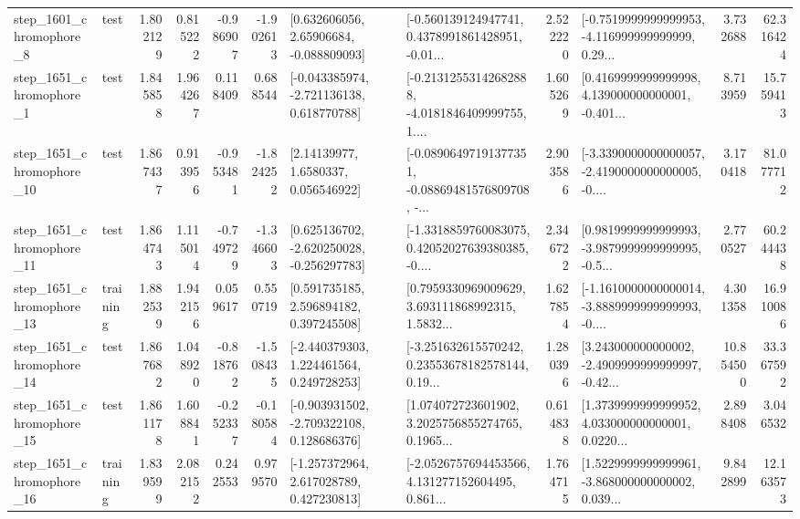 \begin{tabular}{llrrrrllrlrr}
  step\_1601\_chromophore\_8 &      test &      1.802129 &    0.815222 &     -0.986907 & -1.902613 &     [0.632606056, 2.65906684, -0.088809093] &  [-0.560139124947741, 0.4378991861428951, -0.01... &       2.522220 &  [-0.7519999999999953, -4.116999999999999, 0.29... &            3.732688 &         62.316424 \\
  step\_1651\_chromophore\_1 &      test &      1.845858 &    1.964267 &      0.118409 &  0.688544 &   [-0.043385974, -2.721136138, 0.618770788] &  [-0.21312553142682888, -4.0181846409999755, 1.... &       1.605269 &  [0.4169999999999998, 4.139000000000001, -0.401... &            8.713959 &         15.759413 \\
 step\_1651\_chromophore\_10 &      test &      1.867437 &    0.913956 &     -0.953481 & -1.824252 &        [2.14139977, 1.6580337, 0.056546922] &  [-0.08906497191377351, -0.08869481576809708, -... &       2.903586 &  [-3.3390000000000057, -2.4190000000000005, -0.... &            3.170418 &         81.077712 \\
 step\_1651\_chromophore\_11 &      test &      1.864743 &    1.115014 &     -0.749729 & -1.346603 &   [0.625136702, -2.620250028, -0.256297783] &  [-1.3318859760083075, 0.42052027639380385, -0.... &       2.346722 &  [0.9819999999999993, -3.9879999999999995, -0.5... &            2.770527 &         60.244438 \\
 step\_1651\_chromophore\_13 &  training &      1.882539 &    1.942156 &      0.059617 &  0.550719 &     [0.591735185, 2.596894182, 0.397245508] &  [0.7959330969009629, 3.693111868992315, 1.5832... &       1.627854 &  [-1.1610000000000014, -3.8889999999999993, -0.... &            4.301358 &         16.910086 \\
 step\_1651\_chromophore\_14 &      test &      1.867682 &    1.048920 &     -0.818762 & -1.508435 &    [-2.440379303, 1.224461564, 0.249728253] &  [-3.251632615570242, 0.23553678182578144, 0.19... &       1.280396 &  [3.243000000000002, -2.4909999999999997, -0.42... &           10.854500 &         33.367592 \\
 step\_1651\_chromophore\_15 &      test &      1.861178 &    1.608841 &     -0.252337 & -0.180584 &   [-0.903931502, -2.709322108, 0.128686376] &  [1.074072723601902, 3.2025756855274765, 0.1965... &       0.614838 &  [1.3739999999999952, 4.033000000000001, 0.0220... &            2.898408 &          3.046532 \\
 step\_1651\_chromophore\_16 &  training &      1.839599 &    2.082152 &      0.242553 &  0.979570 &    [-1.257372964, 2.617028789, 0.427230813] &  [-2.0526757694453566, 4.131277152604495, 0.861... &       1.764715 &  [1.5229999999999961, -3.868000000000002, 0.039... &            9.842899 &         12.163573 \\

\end{tabular}
